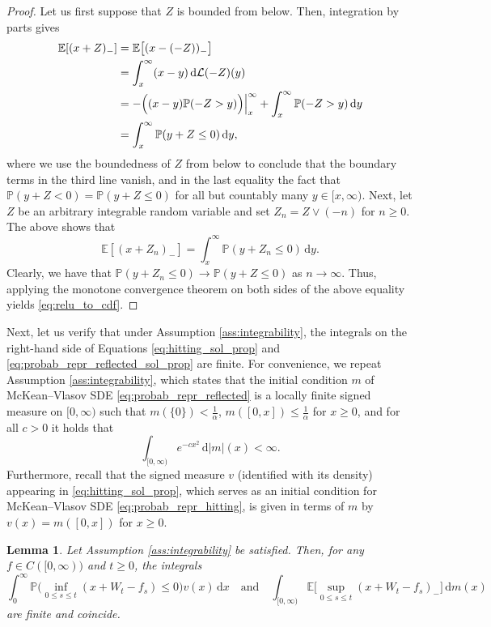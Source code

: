 \documentclass[11pt, a4paper]{article}
\theoremstyle{plain}
\newtheorem{lemma}[theorem]{Lemma}
\theoremstyle{definition}
\theoremstyle{remark}
\numberwithin{equation}{section}
\newcommand{\ev}{\mathbb{E}}
\newcommand{\pr}{\mathbb{P}}
\renewcommand{\L}{\mathcal{L}}
\renewcommand{\d}{\mathrm{d}}
\begin{document}
\begin{proof}
Let us first suppose that $Z$ is bounded from below. Then, integration by parts gives
\begin{align*}
    \ev[(x + Z)_-] &= \ev\bigl[(x - (-Z))_-\bigr] \\
    &= \int_x^{\infty} (x - y) \, \d \L(-Z)(y) \\
    &= -\Bigl((x - y) \pr(-Z > y)\Bigr)\Big\vert_x^{\infty} + \int_x^{\infty} \pr(-Z > y) \, \d y \\
    &= \int_x^{\infty} \pr(y + Z \leq 0) \, \d y,
\end{align*}
where we use the boundedness of $Z$ from below to conclude that the boundary terms in the third line vanish, and in the last equality the fact that $\pr(y + Z < 0) = \pr(y + Z \leq 0)$ for all but countably many $y \in [x, \infty)$. Next, let $Z$ be an arbitrary integrable random variable and set $Z_n = Z \lor (-n)$ for $n \geq 0$. The above shows that
\begin{equation*}
    \ev[(x + Z_n)_-] = \int_x^{\infty} \pr(y + Z_n \leq 0) \, \d y.
\end{equation*}
Clearly, we have that $\pr(y + Z_n \leq 0) \to \pr(y + Z \leq 0)$ as $n \to \infty$. Thus, applying the monotone convergence theorem on both sides of the above equality yields \eqref{eq:relu_to_cdf}.
\end{proof}

Next, let us verify that under Assumption \ref{ass:integrability}, the integrals on the right-hand side of Equations \eqref{eq:hitting_sol_prop} and \eqref{eq:probab_repr_reflected_sol_prop} are finite. For convenience, we repeat Assumption \ref{ass:integrability}, which states that the initial condition $m$ of McKean--Vlasov SDE \eqref{eq:probab_repr_reflected} is a locally finite signed measure on $[0, \infty)$ such that $m(\{0\}) < \frac{1}{\alpha}$, $m([0, x]) \leq \frac{1}{\alpha}$ for $x \geq 0$, and for all $c > 0$ it holds that
\begin{equation*}
    \int_{[0, \infty)} e^{-c x^2} \, \d \lvert m\rvert(x) < \infty.
\end{equation*}
Furthermore, recall that the signed measure $v$ (identified with its density) appearing in \eqref{eq:hitting_sol_prop}, which serves as an initial condition for McKean--Vlasov SDE \eqref{eq:probab_repr_hitting}, is given in terms of $m$ by $v(x) = m([0, x])$ for $x \geq 0$.


\begin{lemma} \label{lem:integrals_finite}
Let Assumption \ref{ass:integrability} be satisfied. Then, for any $f \in C([0, \infty))$ and $t \geq 0$, the integrals
\begin{equation} \label{eq:hitting_and_reflecting_int}
    \int_0^{\infty} \pr\biggl(\inf_{0 \leq s \leq t} (x + W_t - f_s) \leq 0\biggr) v(x) \, \d x \quad \text{and} \quad \int_{[0, \infty)} \ev\biggl[\sup_{0 \leq s \leq t} (x + W_t - f_s)_-\biggr] \, \d m(x)
\end{equation}
are finite and coincide.
\end{lemma}
\end{document}
